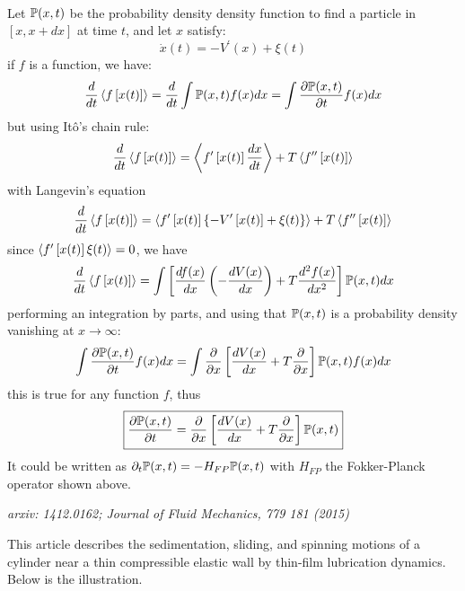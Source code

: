 \documentclass[books,12pt]{elegantpaper}
\begin{document}
\\
Let $\bb{P}(x,t)$ be the probability density density function to find a particle in $\left[x, x + dx\right]$ at time $t$, and let $x$ satisfy:
$$ \dot{x}(t) = -V^\prime(x) + \xi (t) $$
if $f$ is a function, we have:
$$ \frac{d}{dt} \llang f\left[ x(t) \right] \rrang = \frac{d}{dt} \int \bb{P}(x,t) f(x) dx = \int \pder[\bb{P}(x,t)]{t} f(x) dx $$
but using Itô's chain rule:
$$ \frac{d}{dt} \llang f\left[x(t)\right] \rrang = \llang f^\prime \left[ x(t) \right] \frac{dx}{dt} \rrang + T \llang f^{\prime\prime} \left[ x(t) \right] \rrang $$
with Langevin's equation
$$ \frac{d}{dt} \llang f\left[x(t)\right] \rrang = \llang f^\prime \left[ x(t) \right] \left\{ - V^\prime \left[ x(t) \right] + \xi(t) \right\} \rrang + T \llang f^{\prime\prime} \left[ x(t) \right] \rrang $$
since $\llang f^\prime \left[ x(t) \right] \xi(t) \rrang = 0$, we have
$$ \frac{d}{dt} \llang f \left[ x(t) \right] \rrang = \int \left[ \frac{df(x)}{dx} \left( - \frac{dV(x)}{dx} \right) + T \frac{d^2 f(x)}{dx^2} \right] \bb{P}(x,t) dx $$
performing an integration by parts, and using that $\bb{P}(x,t)$ is a probability density vanishing at $x\to\infty$:
$$ \int \pder[\bb{P}(x,t)]{t} f(x) dx = \int \pder{x} \left[ \frac{dV(x)}{dx} + T \pder{x} \right] \bb{P}(x,t) f(x) dx $$
this is true for any function $f$, thus
$$ \boxed{ \pder[\bb{P}(x,t)]{t} = \pder{x} \left[ \frac{dV(x)}{dx} + T \pder{x} \right] \bb{P}(x,t) } $$
It could be written as $\partial_t \bb{P}(x,t) = - H_{FP} \bb{P}(x,t)$ with $H_{FP}$ the Fokker-Planck operator shown above.





\label{ssc:Thomas}

\textit{arxiv: 1412.0162; Journal of Fluid Mechanics, 779 181 (2015)}

This article describes the sedimentation, sliding, and spinning motions of a cylinder near a thin compressible elastic wall by thin-film lubrication dynamics. Below is the illustration. 
\end{document}
